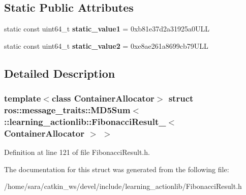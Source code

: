 \subsection*{Static Public Attributes}
\begin{DoxyCompactItemize}
\item 
\mbox{\label{structros_1_1message__traits_1_1MD5Sum_3_01_1_1learning__actionlib_1_1FibonacciResult___3_01ContainerAllocator_01_4_01_4_aa36dab9b253595f8c98f403e99dd8dae}} 
static const uint64\+\_\+t {\bfseries static\+\_\+value1} = 0xb81e37d2a31925a0\+U\+LL
\item 
\mbox{\label{structros_1_1message__traits_1_1MD5Sum_3_01_1_1learning__actionlib_1_1FibonacciResult___3_01ContainerAllocator_01_4_01_4_ac1e96879da45a36ae96fe52fe3dfc252}} 
static const uint64\+\_\+t {\bfseries static\+\_\+value2} = 0xe8ae261a8699cb79\+U\+LL
\end{DoxyCompactItemize}


\subsection{Detailed Description}
\subsubsection*{template$<$class Container\+Allocator$>$\newline
struct ros\+::message\+\_\+traits\+::\+M\+D5\+Sum$<$ \+::learning\+\_\+actionlib\+::\+Fibonacci\+Result\+\_\+$<$ Container\+Allocator $>$ $>$}



Definition at line 121 of file Fibonacci\+Result.\+h.



The documentation for this struct was generated from the following file\+:\begin{DoxyCompactItemize}
\item 
/home/sara/catkin\+\_\+ws/devel/include/learning\+\_\+actionlib/Fibonacci\+Result.\+h\end{DoxyCompactItemize}
